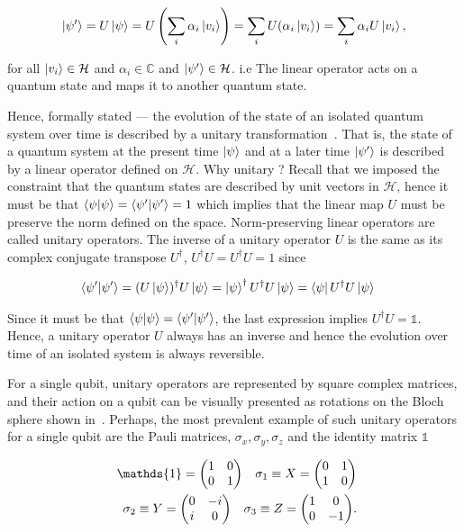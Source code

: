 \begin{align}
    \ket{\psi'}= U\ket{\psi}=U\left(\displaystyle\sum_{i}\alpha_i\ket{v_i}\right) =
    \displaystyle\sum_{i}U(\alpha_i \ket{v_i}) =
    \displaystyle\sum_{i}\alpha_i U\ket{v_i},
\end{align}

\noindent
for all $\ket{v_i} \in \mathcal{H}$ and $\alpha_i \in \mathbb{C}$ and $\ket{\psi'} \in \mathcal{H}$. i.e The linear operator acts on a quantum state and maps it to another quantum state.

\bigskip
\noindent
Hence, formally stated --- the evolution of the state of an isolated quantum system over time is described by a unitary transformation~\cite{Mike&Ike}. That is, the state of a quantum system at the present time $\ket{\psi}$ and at a later time $\ket{\psi'}$ is described by a linear operator defined on $\mathcal{H}$. Why unitary ? Recall that we imposed the constraint that the quantum states are described by unit vectors in $\mathcal{H}$, hence it must be that $\ip{\psi} = \ip{\psi'}=1$ which implies that the linear map $U$ must be preserve the norm defined on the space. Norm-preserving linear operators are called unitary operators. The inverse of a unitary operator $U$ is the same as its complex conjugate transpose $U^{\dagger}$, \ie $U^{\dagger}U = U^{\dagger}U= 1$ since 

\begin{align}
	\ip{\psi'} &= (U\ket{\psi})^{\dagger}U\ket{\psi} = \ket{\psi}^{\dagger}U^{\dagger}U\ket{\psi} = \bra{\psi}U^{\dagger}U\ket{\psi}
\end{align}

\noindent
Since it must be that $\ip{\psi}=\ip{\psi'}$, the last expression implies $U^{\dagger} U = \mathds{1}$. Hence, a unitary operator $U$ always has an inverse and hence the evolution over time of an isolated system is always reversible.

\clearpage
\noindent
For a single qubit, unitary operators are represented by square complex matrices, and their action on a qubit can be visually presented as rotations on the Bloch sphere shown in~. 	Perhaps, the most prevalent example of such unitary operators for a single qubit are the Pauli matrices, $\sigma_x, \sigma_y, \sigma_z$ and the identity matrix $\mathds{1}$

\begin{align*}
	\mathds{1} = \mqty(1 & 0 \\ 0 & 1) \quad \sigma_1 \equiv X = \mqty(0 & 1 \\ 1 & 0) \\
	\quad \sigma_2 \equiv Y = \mqty(0 & -i \\ i & 0) \quad \sigma_3 \equiv Z = \mqty(1 & 0 \\ 0 & -1).
\end{align*}

